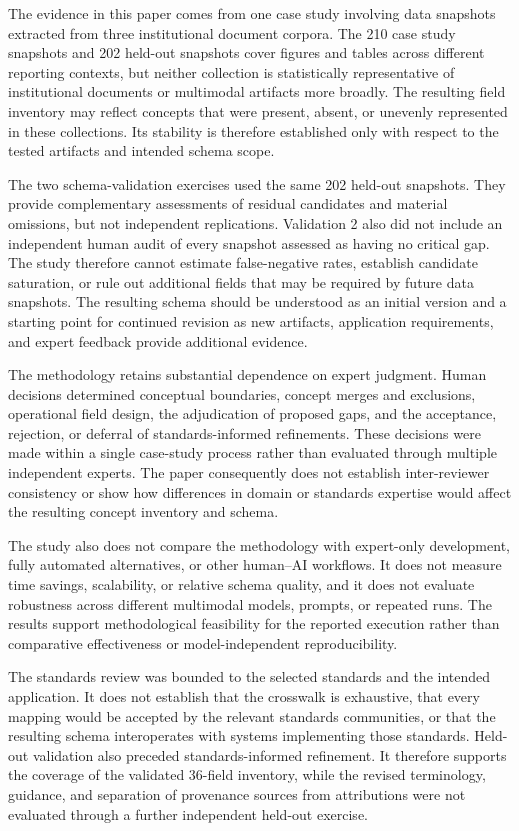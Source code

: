 \documentclass{article}
\begin{document}
The evidence in this paper comes from one case study involving data snapshots extracted from three institutional document corpora. The 210 case study snapshots and 202 held-out snapshots cover figures and tables across different reporting contexts, but neither collection is statistically representative of institutional documents or multimodal artifacts more broadly. The resulting field inventory may reflect concepts that were present, absent, or unevenly represented in these collections. Its stability is therefore established only with respect to the tested artifacts and intended schema scope.

The two schema-validation exercises used the same 202 held-out snapshots. They provide complementary assessments of residual candidates and material omissions, but not independent replications. Validation 2 also did not include an independent human audit of every snapshot assessed as having no critical gap. The study therefore cannot estimate false-negative rates, establish candidate saturation, or rule out additional fields that may be required by future data snapshots. The resulting schema should be understood as an initial version and a starting point for continued revision as new artifacts, application requirements, and expert feedback provide additional evidence.

The methodology retains substantial dependence on expert judgment. Human decisions determined conceptual boundaries, concept merges and exclusions, operational field design, the adjudication of proposed gaps, and the acceptance, rejection, or deferral of standards-informed refinements. These decisions were made within a single case-study process rather than evaluated through multiple independent experts. The paper consequently does not establish inter-reviewer consistency or show how differences in domain or standards expertise would affect the resulting concept inventory and schema.

The study also does not compare the methodology with expert-only development, fully automated alternatives, or other human--AI workflows. It does not measure time savings, scalability, or relative schema quality, and it does not evaluate robustness across different multimodal models, prompts, or repeated runs. The results support methodological feasibility for the reported execution rather than comparative effectiveness or model-independent reproducibility.

The standards review was bounded to the selected standards and the intended application. It does not establish that the crosswalk is exhaustive, that every mapping would be accepted by the relevant standards communities, or that the resulting schema interoperates with systems implementing those standards. Held-out validation also preceded standards-informed refinement. It therefore supports the coverage of the validated 36-field inventory, while the revised terminology, guidance, and separation of provenance sources from attributions were not evaluated through a further independent held-out exercise.
\end{document}
